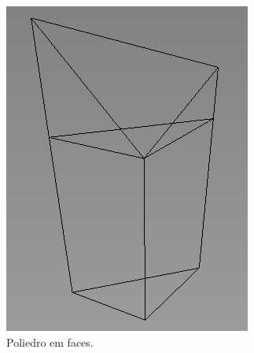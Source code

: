 \begin{figure}[H]
    \centering
    \caption{Exemplo de um poliedro irregular.}
    \begin{subfigure}[t]{0.25\textwidth}
        \includegraphics[width=\textwidth]{dados/figuras/pol_line.png}
        \caption{Poliedro em faces.}
        \label{fig:polyhedron1}
    \end{subfigure}
    \hspace{2em}
    \begin{subfigure}[t]{0.25\textwidth}

\end{subfigure}
\end{figure}
